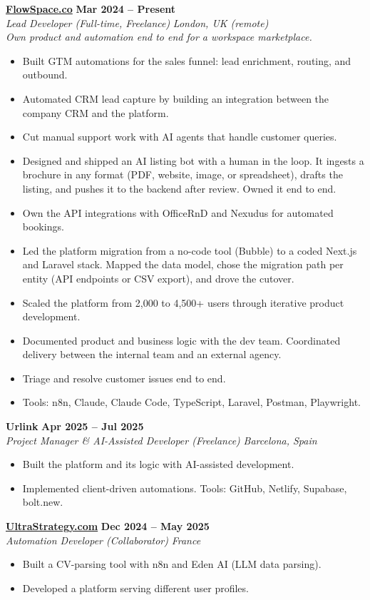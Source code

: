 \documentclass[a4paper,10pt]{article}
\newcommand{\role}[4]{%
  \textbf{#1} \hfill \textbf{#2}\\[1pt]%
  \textit{#3} \hfill \textit{#4}\\[2pt]%
}
\begin{document}
\role{\href{https://flowspace.co}{FlowSpace.co}}{Mar 2024 -- Present}{Lead Developer (Full-time, Freelance)}{London, UK (remote)}
\textit{Own product and automation end to end for a workspace marketplace.}
\begin{itemize}
  \item Built GTM automations for the sales funnel: lead enrichment, routing, and outbound.
  \item Automated CRM lead capture by building an integration between the company CRM and the platform.
  \item Cut manual support work with AI agents that handle customer queries.
  \item Designed and shipped an AI listing bot with a human in the loop. It ingests a brochure in any format (PDF, website, image, or spreadsheet), drafts the listing, and pushes it to the backend after review. Owned it end to end.
  \item Own the API integrations with OfficeRnD and Nexudus for automated bookings.
  \item Led the platform migration from a no-code tool (Bubble) to a coded Next.js and Laravel stack. Mapped the data model, chose the migration path per entity (API endpoints or CSV export), and drove the cutover.
  \item Scaled the platform from 2,000 to 4,500+ users through iterative product development.
  \item Documented product and business logic with the dev team. Coordinated delivery between the internal team and an external agency.
  \item Triage and resolve customer issues end to end.
  \item Tools: n8n, Claude, Claude Code, TypeScript, Laravel, Postman, Playwright.
\end{itemize}

\role{Urlink}{Apr 2025 -- Jul 2025}{Project Manager \& AI-Assisted Developer (Freelance)}{Barcelona, Spain}
\begin{itemize}
  \item Built the platform and its logic with AI-assisted development.
  \item Implemented client-driven automations. Tools: GitHub, Netlify, Supabase, bolt.new.
\end{itemize}

\role{\href{https://ultrastrategy.com}{UltraStrategy.com}}{Dec 2024 -- May 2025}{Automation Developer (Collaborator)}{France}
\begin{itemize}
  \item Built a CV-parsing tool with n8n and Eden AI (LLM data parsing).
  \item Developed a platform serving different user profiles.
\end{itemize}
\end{document}
